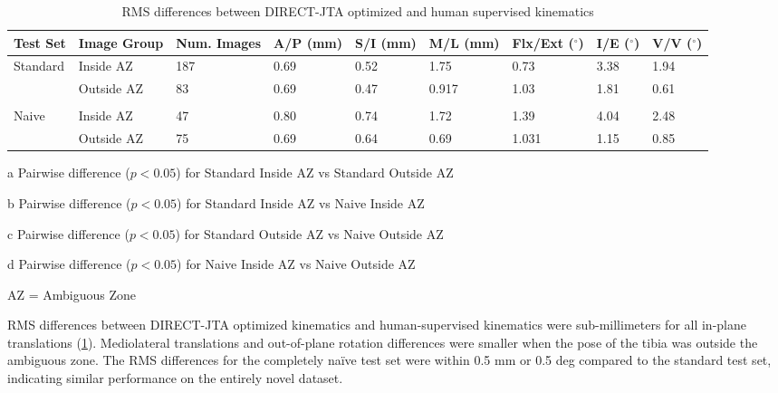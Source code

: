 {\begin{landscape}
	\begin{table}[h!]
		\centering
		\caption{RMS differences between DIRECT-JTA optimized and human supervised kinematics}
		\label{tab:direct-rms}
		\begin{threeparttable}
			\begin{tabularx}{\linewidth}{XXXXXXXXX}
				\hline
				Test Set                  & Image Group & Num. Images & A/P (mm) & S/I (mm)      & M/L (mm)      & Flx/Ext ($^{\circ}$) & I/E ($^{\circ}$) & V/V ($^{\circ}$) \\ %
				\hline
				\multirow{2}{*}{Standard} & Inside AZ   & 187         & 0.69     & 0.52\tnote{b} & 1.75\tnote{a} & 0.73\tnote{a}        & 3.38             & 1.94\tnote{a}    \\
				                          & Outside AZ  & 83          & 0.69     & 0.47\tnote{c} & 0.917         & 1.03                 & 1.81             & 0.61             \\ \\
				\multirow{2}{*}{Naive}    & Inside AZ   & 47          & 0.80     & 0.74          & 1.72          & 1.39                 & 4.04             & 2.48\tnote{d}    \\
				                          & Outside AZ  & 75          & 0.69     & 0.64          & 0.69          & 1.031                & 1.15             & 0.85             \\ \hline
			\end{tabularx}
			\begin{tablenotes}
				\footnotesize
				\item[a] Pairwise difference ($p<0.05$) for Standard Inside AZ vs Standard Outside AZ %
				\item[b] Pairwise difference ($p<0.05$) for Standard Inside AZ vs Naive Inside AZ
				\item[c] Pairwise difference ($p<0.05$) for Standard Outside AZ vs Naive Outside AZ
				\item[d] Pairwise difference ($p<0.05$) for Naive Inside AZ vs Naive Outside AZ

				AZ = Ambiguous Zone
			\end{tablenotes}
		\end{threeparttable}
	\end{table}
\end{landscape}


RMS differences between DIRECT-JTA optimized kinematics and human-supervised kinematics were sub-millimeters for all in-plane translations (\cref{tab:direct-rms}).
Mediolateral translations and out-of-plane rotation differences were smaller when the pose of the tibia was outside the ambiguous zone.
The RMS differences for the completely naïve test set were within 0.5 mm or 0.5 deg compared to the standard test set, indicating similar performance on the entirely novel dataset.

}
